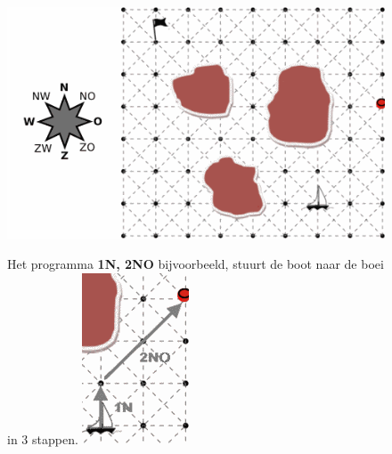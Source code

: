 \documentclass[12pt, a4paper]{article}
\begin{document}
\begin{minipage}{\textwidth}
			\begin{figure}[H]
				\begin{minipage}{0.7\linewidth}
					\includegraphics[width=\linewidth]{image1}
				\end{minipage}
				\hfill
				\begin{minipage}{0.25\linewidth}
					\centering
					Het programma \textbf{1N, 2NO} bijvoorbeeld, stuurt de boot
					naar de boei in 3 stappen.
					\includegraphics[width=0.9\linewidth]{image2}
				\end{minipage}
			\end{figure}
	

\end{minipage}
\end{document}
